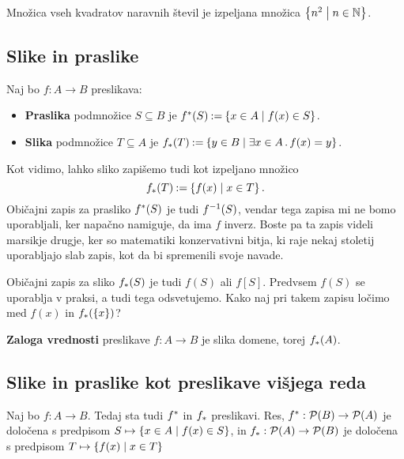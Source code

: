 \begin{primer}
  Množica vseh kvadratov naravnih števil je izpeljana množica $\left\{ n^2 \; \middle| \; n \in \mathbb{N} \right\}$.
\end{primer}


\subsection{Slike in praslike}

\begin{definicija}
  Naj bo $f : A \to B$ preslikava:
  \begin{itemize}
  \item \textbf{Praslika} podmnožice $S \subseteq B$ je $f^{*}(S) \mathbin{{:}{=}} \left\{ x \in A \; \middle| \; f(x) \in S \right\}$.
  \item \textbf{Slika} podmnožice $T \subseteq A$ je $f_{*}(T) \mathbin{{:}{=}} \left\{ y \in B \; \middle| \; \exists x \in A \,.\, f(x) = y \right\}$.
  \end{itemize}
\end{definicija}

Kot vidimo, lahko sliko zapišemo tudi kot izpeljano množico
%
\begin{equation*}
  f_{*}(T) \mathbin{{:}{=}} \left\{ f(x) \; \middle| \; x \in T \right\}.
\end{equation*}
%
Običajni zapis za prasliko $f^{*}(S)$ je tudi ${f}^{-1}(S)$, vendar tega zapisa mi ne bomo uporabljali, ker napačno namiguje, da ima $f$ inverz. Boste pa ta zapis videli marsikje drugje, ker so matematiki konzervativni bitja, ki raje nekaj stoletij uporabljajo slab zapis, kot da bi spremenili svoje navade.

Običajni zapis za sliko $f_{*}(S)$ je tudi $f(S)$ ali $f[S]$. Predvsem $f(S)$ se uporablja v praksi, a tudi tega odsvetujemo. Kako naj pri takem zapisu ločimo med $f(x)$ in $f_{*}(\left\{x\right\})$?

\begin{definicija}
  \textbf{Zaloga vrednosti} preslikave $f : A \to B$ je slika domene, torej $f_{*}(A)$.
\end{definicija}


\subsection{Slike in praslike kot preslikave višjega reda}

Naj bo $f : A \to B$. Tedaj sta tudi $f^{*}$ in $f_{*}$ preslikavi.
%
Res, $f^{*} : \mathcal{P}(B) \to \mathcal{P}(A)$ je določena s predpisom $S \mapsto \left\{ x \in A \; \middle| \; f(x) \in S \right\}$, in
$f_{*} : \mathcal{P}(A) \to \mathcal{P}(B)$ je določena s predpisom $T \mapsto \left\{ f(x) \; \middle| \; x \in T \right\}$

